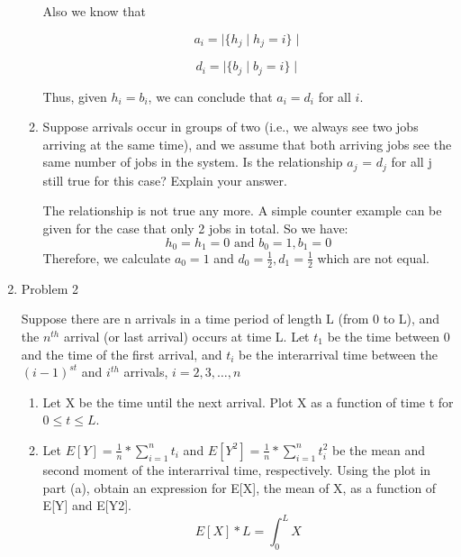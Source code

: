 \documentclass[12pt]{article}
\begin{document}
\begin{enumerate}
\begin{enumerate}
Also we know that

\begin{equation}
a_i = \mid \{h_j \mid h_j = i\} \mid
\end{equation}

\begin{equation}
d_i = \mid \{b_j \mid b_j = i\} \mid
\end{equation}

Thus, given $h_i = b_i$, we can conclude that $a_i = d_i$ for all $i$.
\item{} Suppose arrivals occur in groups of two (i.e., we always see two jobs arriving at the same time), and we assume that both arriving jobs see the same number of jobs in the system. Is the relationship $a_j$ = $d_j$ for all j still true for this case? Explain your answer.

The relationship is not true any more. A simple counter example can be given for the case that only 2 jobs in total. So we have:
\begin{equation}
h_0=h_1=0 \text{ and }b_0=1,b_1=0
\end{equation}
Therefore, we calculate $a_0=1$ and $d_0=\frac{1}{2}, d_1=\frac{1}{2}$ which are not equal.

\end{enumerate}
\medskip

\item{Problem 2}

Suppose there are n arrivals in a time period of length L (from 0 to L), and the $n^{th}$ arrival (or last arrival) occurs at time L. Let $t_1$ be the time between 0 and the time of the first arrival, and $t_i$ be the interarrival time between the $(i-1)^{st}$ and $i^{th}$ arrivals, $i = 2, 3, \dotsc, n$
\begin{enumerate}
\item{} Let X be the time until the next arrival. Plot X as a function of time t for $0 \le t \le L$.


\item{} Let $E[Y] = \frac{1}{n} * \sum^{n}_{i=1}{t_i}$ and $E[Y^2] = \frac{1}{n} * \sum^{n}_{i=1}{t_i^2}$ be the mean and second moment of the interarrival time, respectively. Using the plot in part (a), obtain an expression for E[X], the mean of X, as a function of E[Y] and E[Y2].
\begin{equation}
E[X] * L = \int_{0}^{L}{X}
\end{equation}


\end{enumerate}
\end{enumerate}
\end{document}
